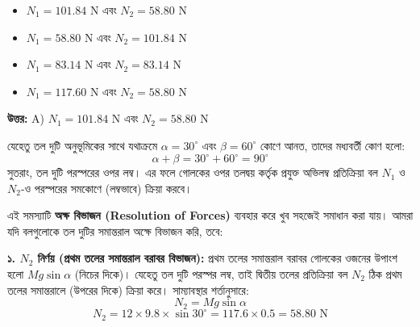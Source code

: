 \documentclass[12pt, a4paper]{article}
\begin{document}
{\begin{center}
\end{center}
\vspace{1em}

\begin{itemize}[label={}, leftmargin=1cm, itemsep=0.5em]
\item[\textbf{A)}] $N_1 = 101.84\text{ N}$ এবং $N_2 = 58.80\text{ N}$
\item[\textbf{B)}] $N_1 = 58.80\text{ N}$ এবং $N_2 = 101.84\text{ N}$
\item[\textbf{C)}] $N_1 = 83.14\text{ N}$ এবং $N_2 = 83.14\text{ N}$
\item[\textbf{D)}] $N_1 = 117.60\text{ N}$ এবং $N_2 = 58.80\text{ N}$
\end{itemize}

\vspace{0.5em}
\begin{tcolorbox}[answerbox]
\textbf{\color{success} উত্তর:} A) $N_1 = 101.84\text{ N}$ এবং $N_2 = 58.80\text{ N}$
\end{tcolorbox}
\vspace{1em}

\begin{tcolorbox}[solutionbox={সমাধান (Solution)}]
\noindent
যেহেতু তল দুটি অনুভূমিকের সাথে যথাক্রমে $\alpha = 30^\circ$ এবং $\beta = 60^\circ$ কোণে আনত, তাদের মধ্যবর্তী কোণ হলো:
$$\alpha + \beta = 30^\circ + 60^\circ = 90^\circ$$
সুতরাং, তল দুটি পরস্পরের ওপর লম্ব। এর ফলে গোলকের ওপর তলদ্বয় কর্তৃক প্রযুক্ত অভিলম্ব প্রতিক্রিয়া বল $N_1$ ও $N_2$-ও পরস্পরের সমকোণে (লম্বভাবে) ক্রিয়া করবে।

এই সমস্যাটি \textbf{অক্ষ বিভাজন (Resolution of Forces)} ব্যবহার করে খুব সহজেই সমাধান করা যায়। আমরা যদি বলগুলোকে তল দুটির সমান্তরাল অক্ষে বিভাজন করি, তবে:

\vspace{0.5em}
\textbf{১. $N_2$ নির্ণয় (প্রথম তলের সমান্তরাল বরাবর বিভাজন):}
প্রথম তলের সমান্তরাল বরাবর গোলকের ওজনের উপাংশ হলো $Mg \sin\alpha$ (নিচের দিকে)। যেহেতু তল দুটি পরস্পর লম্ব, তাই দ্বিতীয় তলের প্রতিক্রিয়া বল $N_2$ ঠিক প্রথম তলের সমান্তরালে (উপরের দিকে) ক্রিয়া করে। সাম্যাবস্থার শর্তানুসারে:
$$N_2 = Mg \sin\alpha$$
$$N_2 = 12 \times 9.8 \times \sin 30^\circ = 117.6 \times 0.5 = 58.80\text{ N}$$


\end{tcolorbox}}
\end{document}
